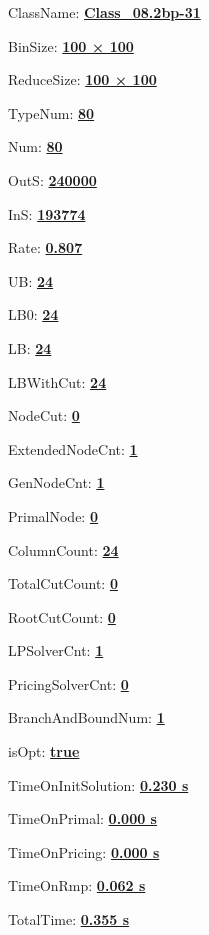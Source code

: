 \documentclass[11pt]{article}
\begin{document}
\pagestyle{empty}


ClassName: \underline{\textbf{Class_08.2bp-31}}
\par
BinSize: \underline{\textbf{100 × 100}}
\par
ReduceSize: \underline{\textbf{100 × 100}}
\par
TypeNum: \underline{\textbf{80}}
\par
Num: \underline{\textbf{80}}
\par
OutS: \underline{\textbf{240000}}
\par
InS: \underline{\textbf{193774}}
\par
Rate: \underline{\textbf{0.807}}
\par
UB: \underline{\textbf{24}}
\par
LB0: \underline{\textbf{24}}
\par
LB: \underline{\textbf{24}}
\par
LBWithCut: \underline{\textbf{24}}
\par
NodeCut: \underline{\textbf{0}}
\par
ExtendedNodeCnt: \underline{\textbf{1}}
\par
GenNodeCnt: \underline{\textbf{1}}
\par
PrimalNode: \underline{\textbf{0}}
\par
ColumnCount: \underline{\textbf{24}}
\par
TotalCutCount: \underline{\textbf{0}}
\par
RootCutCount: \underline{\textbf{0}}
\par
LPSolverCnt: \underline{\textbf{1}}
\par
PricingSolverCnt: \underline{\textbf{0}}
\par
BranchAndBoundNum: \underline{\textbf{1}}
\par
isOpt: \underline{\textbf{true}}
\par
TimeOnInitSolution: \underline{\textbf{0.230 s}}
\par
TimeOnPrimal: \underline{\textbf{0.000 s}}
\par
TimeOnPricing: \underline{\textbf{0.000 s}}
\par
TimeOnRmp: \underline{\textbf{0.062 s}}
\par
TotalTime: \underline{\textbf{0.355 s}}
\par
\newpage


\end{document}
